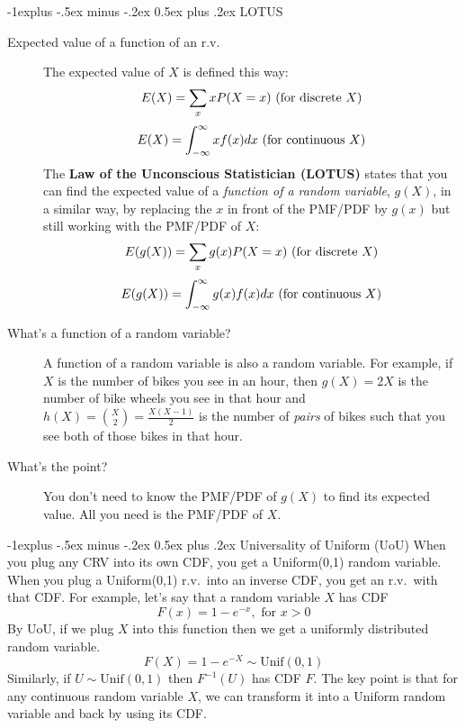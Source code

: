 \documentclass[6pt, landscape]{article}
\makeatletter
\renewcommand{\subsection}{\@startsection{subsection}{2}{0mm}%
                                {-1explus -.5ex minus -.2ex}%
                                {0.5ex plus .2ex}%
                                {\small\bfseries}}
\makeatother
\begin{document}
\begin{multicols}{3}
        \subsection{LOTUS}
        \begin{description}
                \item[Expected value of a function of an r.v.]
                      The expected value of $X$ is defined this way:
                      \[E(X) = \sum_x xP(X=x) \textnormal{ (for discrete $X$)}\]
                      \[E(X) = \int^\infty_{-\infty}xf(x)dx  \textnormal{ (for continuous $X$)}\]
                      The \textbf{Law of the Unconscious Statistician (LOTUS)} states that you can find the expected value of a \emph{function of a random variable}, $g(X)$, in a similar way, by replacing the $x$ in front of the PMF/PDF by $g(x)$ but still working with the PMF/PDF of $X$:
                      \[E(g(X)) = \sum_x g(x)P(X=x) \textnormal{ (for discrete $X$)}\]
                      \[E(g(X)) = \int^\infty_{-\infty}g(x)f(x)dx \textnormal{ (for continuous $X$)}\]
                \item[What's a function of a random variable?] A function of a random variable is also a random variable. For example, if $X$ is the number of bikes you see in an hour, then $g(X) =  2X$ is the number of bike wheels you see in that hour and $h(X) = {X \choose 2} = \frac{X(X-1)}{2}$ is the number of \emph{pairs} of bikes such that you see both of those bikes in that hour.
                \item[What's the point?] You don't need to know the PMF/PDF of $g(X)$ to find its expected value. All you need is the PMF/PDF of $X$.
        \end{description}

        \subsection{Universality of Uniform (UoU)} When you plug any CRV into its own CDF, you get a Uniform(0,1) random variable. When you plug a Uniform(0,1) r.v.~into an inverse CDF, you get an r.v.~with that CDF. For example, let's say that a random variable $X$ has CDF
        \[ F(x) = 1 - e^{-x}, \textrm{ for $x>0$} \]
        By  UoU, if we plug $X$ into this function then we get a uniformly distributed random variable.
        \[ F(X) = 1 - e^{-X} \sim \textrm{Unif}(0,1)\]
        Similarly, if $U \sim \textrm{Unif}(0,1)$ then $F^{-1}(U)$ has CDF $F$. The key point is that {for any continuous random variable $X$, we can transform it into a Uniform random variable and back by using its CDF.}


\end{multicols}
\end{document}
